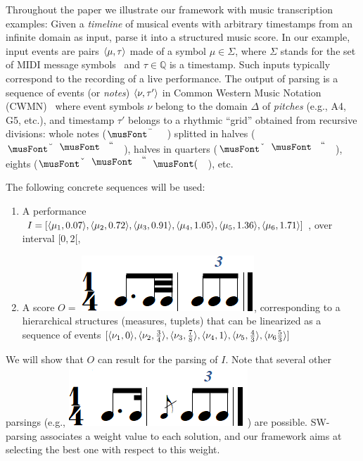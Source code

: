 \begin{example}\label{ex:running}
Throughout the paper we
illustrate our framework with music transcription examples: Given
a \emph{timeline} of musical events with arbitrary timestamps from an infinite
domain as input, parse it
into a structured music score. In our example, input events
are pairs $\< \mu, \tau>$ made of
a symbol $\mu \in \Sigma$, where $\Sigma$ stands for the
set of MIDI message symbols~\cite{?}
and  $\tau \in \mathbb{Q}$ is a timestamp. Such inputs typically correspond
to the recording of a live performance. The output of parsing
is a sequence of events (or \emph{notes}) $\< \nu, \tau'>$   in
Common Western Music Notation (CWMN)~\cite{Gould11Notation}
where event symbols $\nu$ belong to the domain $\Delta$
of \emph{pitches} (e.g., A4, G5, etc.), and timestamp $\tau'$
belongs to a rhythmic ``grid'' obtained from recursive divisions:
whole notes ($\musWhole$) splitted in halves ($\musHalf$), halves
in quarters ($\musQuarter$), eights ($\musEighth$), etc.

The following concrete sequences
will be used:
\begin{enumerate}
  \item A performance  $I = [ \<\mu_1, 0.07>, \<\mu_2, 0.72>, \<\mu_3, 0.91>, \<\mu_4, 1.05>, \<\mu_5, 1.36>, \<\mu_6, 1.71>]$,
     over interval $[0,2[$,
  \item A score $O =$ \includegraphics[scale=0.20]{pictures/score5.png}, corresponding to
      a hierarchical structures (measures, tuplets) that can be linearized as a sequence of events
      $[\<\nu_1,0>, \<\nu_2,\frac{3}{4}>, \<\nu_3,\frac{7}{8}>, \<\nu_4,1>, \<\nu_5,\frac{4}{3}>, \<\nu_6\frac{5}{3}>]$
\end{enumerate}
\smallskip

We will show that $O$  can result for the
parsing of $I$. Note that several other parsings (e.g.,
\includegraphics[scale=0.20]{pictures/score4.png}) are possible.
SW-parsing associates a weight value
to each solution, and our framework
aims at selecting the best one with respect to this weight.
\endex
\end{example}
